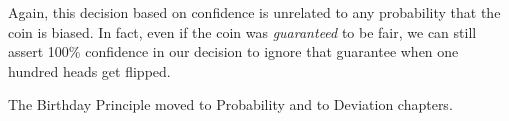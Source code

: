 Again, this decision based on confidence is unrelated to any
probability that the coin is biased.  In fact, even if the coin was
\emph{guaranteed} to be fair, we can still assert 100\% confidence in
our decision to ignore that guarantee when one hundred heads get
flipped.

\begin{problems}
\practiceproblems
{}

\classproblems
{}

\begin{editingnotes}
The Birthday Principle %
moved to Probability and to Deviation chapters.
\end{editingnotes}


\examproblems
{}

\homeworkproblems
{}

\end{problems}

\endinput


